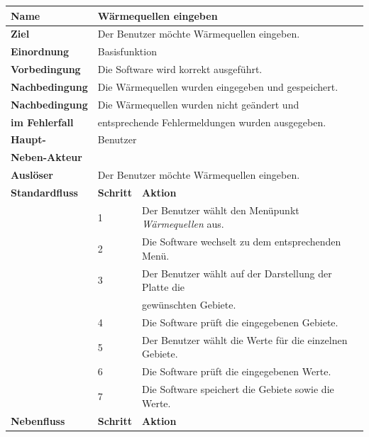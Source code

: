 \begin{table} [H]
	\centering
	\begin{tabular}{|l|l|l|}
		\hline
		\textbf{Name} 			& \multicolumn{2}{|l|}{Wärmequellen eingeben}  \\
		\hline
		\textbf{Ziel} 			& \multicolumn{2}{|l|}{Der Benutzer möchte Wärmequellen eingeben. }\\ 
		\hline
		\textbf{Einordnung}		& \multicolumn{2}{|l|}{Basisfunktion}\\
		\hline
		\textbf{Vorbedingung}	& \multicolumn{2}{|l|}{Die Software wird korrekt ausgeführt.} \\
		\hline
		\textbf{Nachbedingung}	& \multicolumn{2}{|l|}{Die Wärmequellen wurden eingegeben und gespeichert.}\\
		\hline
		\textbf{Nachbedingung} 	& \multicolumn{2}{|l|}{Die Wärmequellen wurden nicht geändert und}\\
		\textbf{im Fehlerfall}	& \multicolumn{2}{|l|}{entsprechende Fehlermeldungen wurden ausgegeben.}\\
		\hline
		\textbf{Haupt-} 			& \multicolumn{2}{|l|}{Benutzer}\\
		\textbf{Neben-Akteur}	& \multicolumn{2}{|l|}{	}			\\
		\hline
		\textbf{Auslöser} 		& \multicolumn{2}{|l|}{Der Benutzer möchte Wärmequellen eingeben.} \\
		\hline 
		\textbf{Standardfluss} & \textbf{Schritt} & \textbf{Aktion} \\
		\hline
		&	1	& Der Benutzer wählt den Menüpunkt \emph{Wärmequellen} aus. \\
		\cline{2-3}
		&	2	& Die Software wechselt zu dem entsprechenden Menü.\\
		\cline{2-3}
		&	3	& Der Benutzer wählt auf der Darstellung der Platte die \\
		&       & gewünschten Gebiete.\\
		\cline{2-3}
		&	4	& Die Software prüft die eingegebenen Gebiete.\\
		\cline{2-3}
		&	5	& Der Benutzer wählt die Werte für die einzelnen Gebiete.\\
		\cline{2-3}
		&	6	& Die Software prüft die eingegebenen Werte.\\
		\cline{2-3}
		&	7	& Die Software speichert die Gebiete sowie die Werte.\\
		\hline
		\textbf{Nebenfluss} & \textbf{Schritt} & \textbf{Aktion}\\

\end{tabular}
\end{table}
